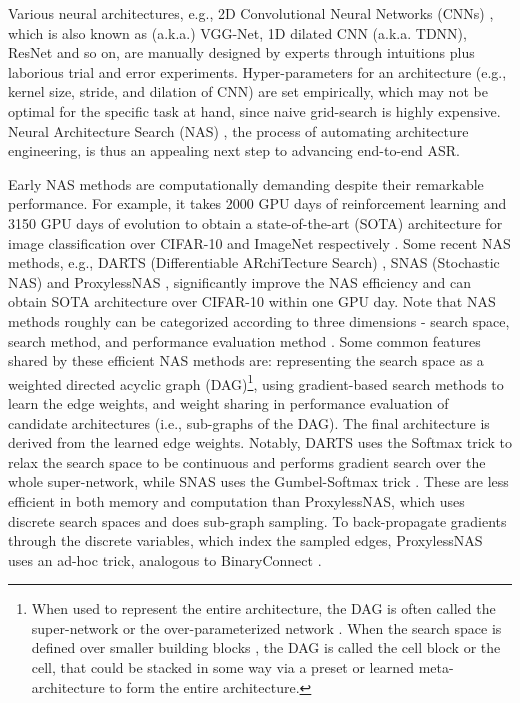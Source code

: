\documentclass{article}
\begin{document}
Various neural architectures, e.g., 2D Convolutional Neural Networks (CNNs) \cite{simonyan2014very}, which is also known as (a.k.a.) VGG-Net, 1D dilated CNN \cite{peddinti2015time} (a.k.a. TDNN), ResNet \cite{he2016deep} and so on, are manually designed by experts through intuitions plus laborious trial and error experiments.
Hyper-parameters for an architecture (e.g., kernel size, stride, and dilation of CNN) are set empirically, which may not be optimal for the specific task at hand, since naive grid-search is highly expensive.
Neural Architecture Search (NAS) \cite{zoph2016neural}, the process of automating architecture engineering, is thus an appealing next step to advancing end-to-end ASR.

Early NAS methods are computationally demanding despite their remarkable performance. For example, it takes 2000 GPU days of reinforcement learning and 3150 GPU days of evolution to obtain a state-of-the-art (SOTA) architecture for image classification over CIFAR-10 \cite{zoph2018learning} and ImageNet \cite{real2019regularized} respectively .
Some recent NAS methods, e.g., DARTS (Differentiable ARchiTecture Search) \cite{liu2018darts}, SNAS (Stochastic NAS) \cite{xie2018snas} and ProxylessNAS \cite{cai2018proxelessnas}, significantly improve the NAS efficiency and can obtain SOTA architecture over CIFAR-10 within one GPU day.
Note that NAS methods roughly can be categorized according to three dimensions - search space, search method, and performance evaluation method \cite{elsken2019neural}.
Some common features shared by these efficient NAS methods are: representing the search space as a weighted directed acyclic graph (DAG)\footnote{When used to represent the entire architecture, the DAG is often called the super-network \cite{veniat2018learning,wu2019fbnet} or the over-parameterized network \cite{cai2018proxelessnas}.
    When the search space is defined over smaller building blocks \cite{pham2018efficient, liu2018darts}, the DAG is called the cell block or the cell, that could be stacked in some way via a preset or learned meta-architecture to form the entire architecture.}, using gradient-based search methods to learn the edge weights, and weight sharing in performance evaluation of candidate architectures (i.e., sub-graphs of the DAG).
The final architecture is derived from the learned edge weights.
Notably, DARTS uses the Softmax trick to relax the search space to be continuous and performs gradient search over the whole super-network, while SNAS uses the Gumbel-Softmax trick \cite{Jang2016Categorical}.
These are less efficient in both memory and computation than ProxylessNAS, which uses discrete search spaces and does sub-graph sampling.
To back-propagate gradients through the discrete variables, which index the sampled edges, ProxylessNAS uses an ad-hoc trick, analogous to BinaryConnect \cite{courbariaux2015binaryconnect}.
\end{document}
